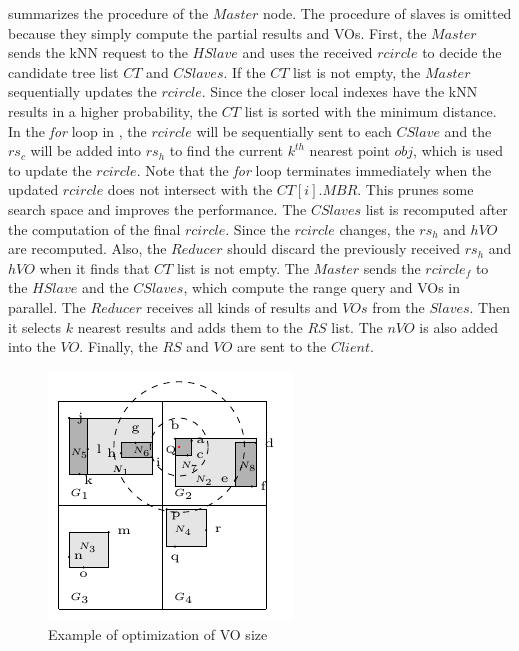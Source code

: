  summarizes the procedure of the $Master$ node. The procedure of slaves is omitted because they simply compute the partial results and VOs. First, the $Master$ sends the kNN request to the $HSlave$ and uses the received $rcircle$ to decide the candidate tree list $CT$ and $CSlaves$. If the $CT$ list is not empty, the $Master$ sequentially updates the $rcircle$. Since the closer local indexes have the kNN results in a higher probability, the $CT$ list is sorted with the minimum distance. In the \emph{for} loop in , the $rcircle$ will be sequentially sent to each $CSlave$ and the $rs_{c}$ will be added into $rs_{h}$ to find the current $k^{th}$ nearest point $obj$, which is used to update the $rcircle$. Note that the \emph{for} loop terminates immediately when the updated $rcircle$ does not intersect with the $CT[i].MBR$. This prunes some search space and improves the performance. The $CSlaves$ list is recomputed after the computation of the final $rcircle$. Since the $rcircle$ changes, the $rs_{h}$ and $hVO$ are recomputed. Also, the $Reducer$ should discard the previously received $rs_{h}$ and $hVO$ when it finds that $CT$ list is not empty. The $Master$ sends the $rcircle_{f}$ to the $HSlave$ and the $CSlaves$, which compute the range query and VOs in parallel. The $Reducer$ receives all kinds of results and $VOs$ from the $Slaves$. Then it selects $k$ nearest results and adds them to the $RS$ list. The $nVO$ is also added into the $VO$. Finally, the $RS$ and $VO$ are sent to the $Client$.

\begin{figure}[t]
  \centering
  \includegraphics[width=.4\linewidth]{figs/knn/optimize.pdf}
  \caption{Example of optimization of VO size}\label{fig:knn:opt}
\end{figure}

